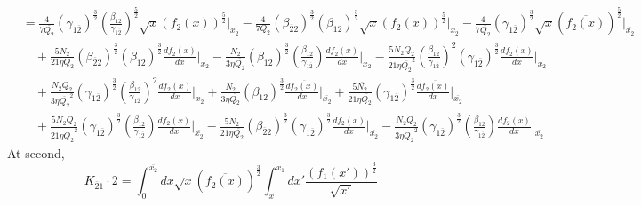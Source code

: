 \documentclass[fleqn, 10pt]{article}
\begin{document}
                \begin{equation}
                \begin{split}
                    & =   \frac{4}{7\overline{Q_{2}}} (\gamma_{1\overline{2}})^\frac{3}{2} \left( \frac{\beta_{12}}{\gamma_{1\overline{2}}}\right)^\frac{5}{2} \sqrt{x} (f_2(x))^\frac{5}{2} \Bigg|_{x_2} -   \frac{4}{7 Q_2} (\beta_{\overline{2}2})^\frac{3}{2} (\beta_{12})^\frac{3}{2} \sqrt{x} (f_2(x))^\frac{5}{2} \Bigg|_{x_2} -  \frac{4}{7 \overline{Q_{2}}} (\gamma_{1\overline{2}})^\frac{3}{2} \sqrt{x} (\overline{f_{2}(x)})^\frac{5}{2} \Bigg|_{\overline{x_{2}}} \\ & \quad +   \frac{5 N_2}{21 \eta Q_2} (\beta_{\overline{2}2})^\frac{3}{2} (\beta_{12})^\frac{3}{2} \frac{df_2(x)}{dx} \Bigg|_{x_2}  -   \frac{N_2}{3 \eta \overline{Q_{2}}} (\beta_{12})^\frac{3}{2} \left( \frac{\beta_{12}}{\gamma_{1\overline{2}}}\right) \frac{df_2(x)}{dx} \Bigg|_{x_2} -    \frac{5 N_2 Q_2}{21 \eta {\overline{Q_{2}}}^2} \left( \frac{\beta_{12}}{\gamma_{1\overline{2}}}\right)^2 (\gamma_{1\overline{2}})^\frac{3}{2} \frac{df_2(x)}{dx} \Bigg|_{x_2} \\ & \quad +  \frac{N_2 Q_2}{3 \eta {\overline{Q_{2}}}^2} (\gamma_{1\overline{2}})^\frac{3}{2} \left( \frac{\beta_{12}}{\gamma_{1\overline{2}}}\right)^2 \frac{df_2(x)}{dx} \Bigg|_{x_2} +  \frac{N_2}{3 \eta \overline{Q_{2}}} (\beta_{12})^\frac{3}{2} \frac{d\overline{f_{2}(x)}}{dx} \Bigg|_{\overline{x_{2}}} +  \frac{5 \overline{N_{2}}}{21 \eta \overline{Q_{2}}} (\gamma_{1\overline{2}})^\frac{3}{2} \frac{d\overline{f_{2}(x)}}{dx} \Bigg|_{\overline{x_{2}}}  \\ & \quad +   \frac{5 N_2 Q_2}{21 \eta {\overline{Q_{2}}}^2} (\gamma_{1\overline{2}})^\frac{3}{2} \left( \frac{\beta_{12}}{\gamma_{1\overline{2}}}\right)\frac{d\overline{f_{2}(x)}}{dx} \Bigg|_{\overline{x_{2}}}  -  \frac{5 N_2}{21 \eta \overline{Q_{2}}} (\beta_{\overline{2}2})^\frac{3}{2} (\gamma_{1\overline{2}})^\frac{3}{2} \frac{d\overline{f_{2}(x)}}{dx} \Bigg|_{\overline{x_{2}}} -   \frac{N_2 Q_2}{3 \eta {\overline{Q_{2}}}^2} (\gamma_{1\overline{2}})^\frac{3}{2} \left( \frac{\beta_{12}}{\gamma_{1\overline{2}}}\right)\frac{d\overline{f_{2}(x)}}{dx} \Bigg|_{\overline{x_{2}}}
                    \end{split}
                \end{equation}
                At second,
                \begin{equation}
                    K_{\overline{2}1} \cdot 2 = \int^{\overline{x_{2}}}_0 dx \sqrt{x} (\overline{f_{2}(x)})^\frac{3}{2} \int^{x_1}_{x} dx' \frac{(f_1(x'))^\frac{3}{2}}{\sqrt{x'}}
                    \label{86}
                \end{equation}
\end{document}
